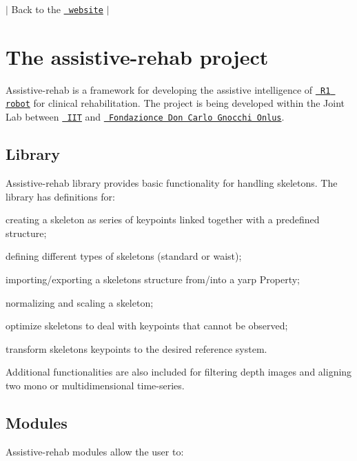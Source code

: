 $\vert$ Back to the \href{https://robotology.github.io/assistive-rehab/doc/mkdocs/site/index.html}{\texttt{ website}} $\vert$

\section*{The assistive-\/rehab project}

Assistive-\/rehab is a framework for developing the assistive intelligence of \href{https://www.youtube.com/watch?v=TBphNGW6m4o}{\texttt{ R1 robot}} for clinical rehabilitation. The project is being developed within the Joint Lab between \href{https://www.iit.it}{\texttt{ I\+IT}} and \href{https://www.dongnocchi.it}{\texttt{ Fondazionce Don Carlo Gnocchi Onlus}}.

\subsection*{Library}

Assistive-\/rehab library provides basic functionality for handling skeletons. The library has definitions for\+:


\begin{DoxyItemize}
\item creating a skeleton as series of keypoints linked together with a predefined structure;
\item defining different types of skeletons (standard or waist);
\item importing/exporting a skeleton\textquotesingle{}s structure from/into a yarp Property;
\item normalizing and scaling a skeleton;
\item optimize skeletons to deal with keypoints that cannot be observed;
\item transform skeleton\textquotesingle{}s keypoints to the desired reference system.
\end{DoxyItemize}

Additional functionalities are also included for filtering depth images and aligning two mono or multidimensional time-\/series.

\subsection*{Modules}

Assistive-\/rehab modules allow the user to\+:


